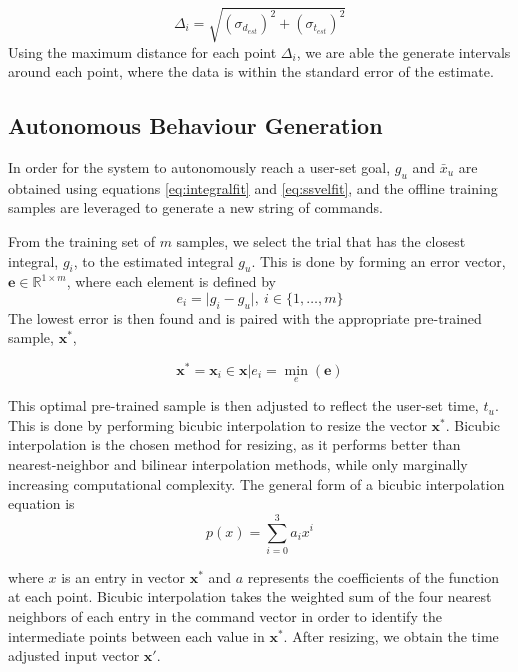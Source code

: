 \documentclass[letterpaper, 10 pt, conference]{ieeeconf}  %
\newcommand{\R}{\mathbb{R}}
\begin{document}
\begin{equation}
    \Delta_i = \sqrt{(\sigma_{d_{est}})^2+(\sigma_{t_{est}})^2}
\end{equation}
Using the maximum distance for each point $\Delta_i$, we are able the generate intervals around each point, where the data is within the standard error of the estimate.


\subsection{Autonomous Behaviour Generation}

In order for the system to autonomously reach a user-set goal, $g_u$ and $\bar{x}_u$ are obtained using equations \eqref{eq:integralfit} and \eqref{eq:ssvelfit}, and the offline training samples are leveraged to generate a new string of commands.

From the training set of $m$ samples, we select the trial that has the closest integral, $g_i$, to the estimated integral $g_u$. This is done by forming an error vector, $\mathbf{e}\in\R^{1\times m}$, where each element is defined by
\begin{equation}
 e_i = \vert g_i-g_u \vert , ~i\in \{1,\ldots,m\}
\end{equation}
 The lowest error is then found and is paired with the appropriate pre-trained sample, $\mathbf{x}^*$,

\begin{equation}
\mathbf{x}^* = \mathbf{x}_i \in \mathbf{x}\vert e_i = \min_e(\mathbf{e})
\end{equation}

This optimal pre-trained sample is then adjusted to reflect the user-set time, $t_u$. This is done by performing bicubic interpolation to resize the vector $\mathbf{x}^*$. Bicubic interpolation is the chosen method for resizing, as it performs better than nearest-neighbor and bilinear interpolation methods, while only marginally increasing computational complexity. The general form of a bicubic interpolation equation is 
\begin{equation}
    p(x) = \sum_{i=0}^3a_ix^i
\end{equation}

where $x$ is an entry in vector $\mathbf{x}^*$ and $a$ represents the coefficients of the function at each point. Bicubic interpolation takes the weighted sum of the four nearest neighbors of each entry in the command vector in order to identify the intermediate points between each value in $\mathbf{x}^*$. After resizing, we obtain the time adjusted input vector $\mathbf{x}'$. 
\end{document}
